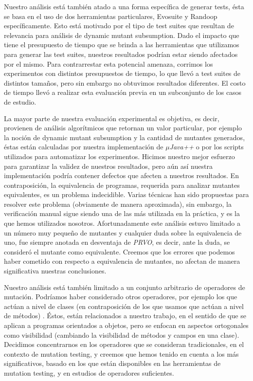 Nuestro an\'alisis est\'a tambi\'en atado a una forma espec\'ifica de generar tests, \'esta se basa en el uso de dos herramientas particulares, Evosuite y Randoop espec\'ificamente. Esto est\'a motivado por el tipo de test suites que resultan de relevancia para an\'alisis de dynamic mutant subsumption. Dado el impacto que tiene el presupuesto de tiempo que se brinda a las herramientas que utilizamos para generar las test suites, nuestros resultados podr\'ian estar siendo afectados por el mismo. Para contrarrestar esta potencial amenaza, corrimos los experimentos con distintos presupuestos de tiempo, lo que llev\'o a test suites de distintos tama\~nos, pero sin embargo no obtuvimos resultados diferentes. El costo de tiempo llev\'o a realizar esta evaluaci\'on previa en un subconjunto de los casos de estudio.

La mayor parte de nuestra evaluaci\'on experimental es objetiva, es decir, provienen de an\'alisis algor\'itmicos  que retornan un valor particular, por ejemplo la noci\'on de dynamic mutant subsumption y la cantidad de mutantes generados, \'estas est\'an calculadas por nuestra implementaci\'on de \emph{$\mu$Java++} o por los scripts utilizados para automatizar los experimentos. Hicimos nuestro mejor esfuerzo para garantizar la validez de nuestros resultados, pero a\'un as\'i nuestra implementaci\'on podr\'ia contener defectos que afecten a nuestros resultados. En contraposici\'on, la equivalencia de programas, requerida para analizar mutantes equivalentes, es un problema indecidible. Varias t\'ecnicas han sido propuestas para resolver este problema (obviamente de manera aproximada), sin embargo, la verificaci\'on manual sigue siendo una de las m\'as utilizada en la pr\'actica, y es la que hemos utilizados nosotros. Afortunadamente este an\'alisis estuvo limitado a un n\'umero muy peque\~no de mutantes y cualquier duda sobre la equivalencia de uno, fue siempre anotada en desventaja de \emph{PRVO}, es decir, ante la duda, se consider\'o el mutante como equivalente. Creemos que los errores que podemos haber cometido con respecto a equivalencia de mutantes, no afectan de manera significativa nuestras conclusiones.

Nuestro an\'alisis est\'a tambi\'en limitado a un conjunto arbitrario de operadores de mutaci\'on. Podr\'iamos haber considerado otros operadores, por ejemplo los que act\'uan a nivel de clases (en contraposici\'on de los que usamos que act\'uan a nivel de m\'etodos) \cite{bibliography.mutation.class-level-ops}. \'Estos, est\'an relacionados a nuestro trabajo, en el sentido de que se aplican a programas orientados a objetos, pero se enfocan en aspectos ortogonales como visibilidad (cambiando la visibilidad de m\'etodos y campos en una clase). Decidimos concentrarnos en los operadores que se consideran tradicionales, en el contexto de mutation testing, y creemos que hemos tenido en cuenta a los m\'as significativos, basado en los que est\'an disponibles en las herramientas de mutation testing, y en estudios de operadores suficientes.

